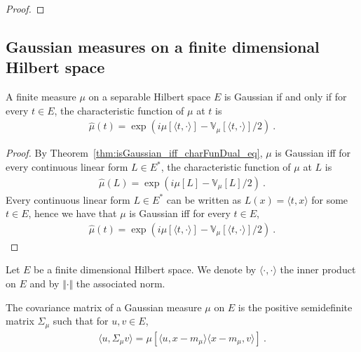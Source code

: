 \begin{proof}\leanok

\end{proof}


\subsection{Gaussian measures on a finite dimensional Hilbert space}

\begin{lemma}\label{lem:isGaussian_iff_charFunDual_inner_eq}
A finite measure $\mu$ on a separable Hilbert space $E$ is Gaussian if and only if for every $t \in E$, the characteristic function of $\mu$ at $t$ is
\begin{align*}
  \hat{\mu}(t) =  \exp\left(i \mu[\langle t, \cdot \rangle] - \mathbb{V}_\mu[\langle t, \cdot \rangle] / 2\right) \: .
\end{align*}
\end{lemma}

\begin{proof}
By Theorem~\ref{thm:isGaussian_iff_charFunDual_eq}, $\mu$ is Gaussian iff for every continuous linear form $L \in E^*$, the characteristic function of $\mu$ at $L$ is
\begin{align*}
  \hat{\mu}(L) = \exp\left(i \mu[L] - \mathbb{V}_\mu[L] / 2\right) \: .
\end{align*}
Every continuous linear form $L \in E^*$ can be written as $L(x) = \langle t, x \rangle$ for some $t \in E$, hence we have that $\mu$ is Gaussian iff for every $t \in E$,
\begin{align*}
  \hat{\mu}(t) = \exp\left(i \mu[\langle t, \cdot \rangle] - \mathbb{V}_\mu[\langle t, \cdot \rangle] / 2\right) \: .
\end{align*}
\end{proof}

Let $E$ be a finite dimensional Hilbert space. We denote by $\langle \cdot, \cdot \rangle$ the inner product on $E$ and by $\Vert \cdot \Vert$ the associated norm.


\begin{definition}\label{def:covMatrix}
The covariance matrix of a Gaussian measure $\mu$ on $E$ is the positive semidefinite matrix $\Sigma_\mu$ such that for $u, v \in E$,
\begin{align*}
  \langle u, \Sigma_\mu v\rangle = \mu[\langle u, x - m_\mu \rangle \langle x - m_\mu, v \rangle] \: .
\end{align*}
\end{definition}


